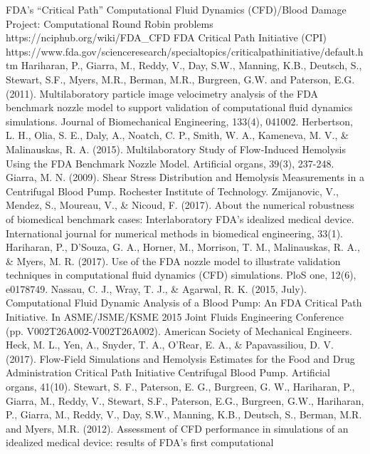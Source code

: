  FDA’s ``Critical Path'' Computational Fluid Dynamics (CFD)/Blood Damage Project: Computational Round Robin problems
https://nciphub.org/wiki/FDA\_CFD
 FDA Critical Path Initiative (CPI) \\\small{https://www.fda.gov/scienceresearch/specialtopics/criticalpathinitiative/default.htm}
 Hariharan, P., Giarra, M., Reddy, V., Day, S.W.,
Manning, K.B., Deutsch, S., Stewart, S.F., Myers, M.R., Berman, M.R., Burgreen, G.W. and Paterson, E.G. (2011).
Multilaboratory particle image velocimetry analysis of the FDA benchmark nozzle model to support validation of computational
fluid dynamics simulations. Journal of Biomechanical Engineering, 133(4), 041002.
 Herbertson, L. H., Olia, S. E., Daly, A., Noatch, C. P., Smith, W. A., Kameneva, M. V., \& Malinauskas, R. A. (2015).
Multilaboratory Study of Flow‐Induced Hemolysis Using the FDA Benchmark Nozzle Model. Artificial organs, 39(3), 237-248.
 Giarra, M. N. (2009). Shear Stress Distribution and Hemolysis Measurements in a Centrifugal Blood Pump. Rochester Institute of
Technology.
 Zmijanovic, V., Mendez, S., Moureau, V., \& Nicoud, F. (2017). About the numerical robustness of biomedical benchmark cases:
Interlaboratory FDA's idealized medical device. International journal for numerical methods in biomedical engineering, 33(1).
 Hariharan, P., D’Souza, G. A., Horner, M., Morrison, T. M., Malinauskas, R. A., \& Myers, M. R. (2017). Use of the FDA nozzle
model to illustrate validation techniques in computational fluid dynamics (CFD) simulations. PloS one, 12(6), e0178749.
 Nassau, C. J., Wray, T. J., \& Agarwal, R. K. (2015, July). Computational Fluid Dynamic Analysis of a Blood Pump: An FDA
Critical Path Initiative. In ASME/JSME/KSME 2015 Joint Fluids Engineering Conference (pp. V002T26A002-V002T26A002).
American Society of Mechanical Engineers.
 Heck, M. L., Yen, A., Snyder, T. A., O'Rear, E. A., \& Papavassiliou, D. V. (2017). Flow‐Field Simulations and Hemolysis
Estimates for the Food and Drug Administration Critical Path Initiative Centrifugal Blood Pump. Artificial organs, 41(10).
 Stewart, S. F., Paterson, E. G., Burgreen, G. W., Hariharan, P., Giarra, M., Reddy, V., Stewart, S.F., Paterson, E.G., Burgreen,
G.W., Hariharan, P., Giarra, M., Reddy, V., Day, S.W., Manning, K.B., Deutsch, S., Berman, M.R. and Myers, M.R. (2012).
Assessment of CFD performance in simulations of an idealized medical device: results of FDA’s first computational
